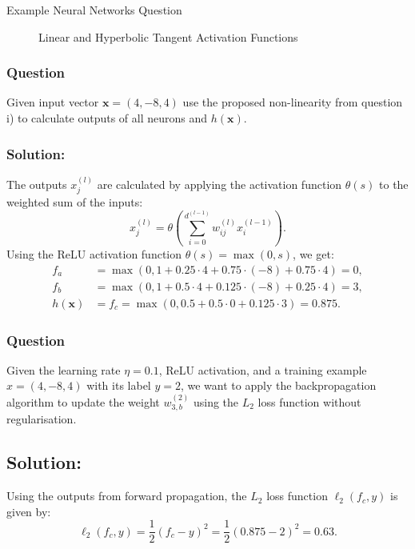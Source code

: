 \begin{examplebox}{Example Neural Networks Question}
\begin{figure}[H]
\caption{Linear and Hyperbolic Tangent Activation Functions}
\end{figure}


\subsubsection*{Question}
Given input vector \( \mathbf{x} = (4, -8, 4) \) use the proposed non-linearity from question i) to calculate outputs of all neurons and \( h(\mathbf{x}) \).

\subsubsection*{Solution:}
The outputs \( x_j^{(l)} \) are calculated by applying the activation function \( \theta(s) \) to the weighted sum of the inputs:
\[ x_j^{(l)} = \theta\left( \sum_{i=0}^{d^{(l-1)}} w_{ij}^{(l)} x_i^{(l-1)} \right). \]
Using the ReLU activation function \( \theta(s) = \max(0, s) \), we get:
\begin{align*}
f_a &= \max(0, 1 + 0.25 \cdot 4 + 0.75 \cdot (-8) + 0.75 \cdot 4) = 0, \\
f_b &= \max(0, 1 + 0.5 \cdot 4 + 0.125 \cdot (-8) + 0.25 \cdot 4) = 3, \\
h(\mathbf{x}) &= f_c = \max(0, 0.5 + 0.5 \cdot 0 + 0.125 \cdot 3) = 0.875.
\end{align*}



\subsubsection*{Question}
Given the learning rate \( \eta = 0.1 \), ReLU activation, and a training example \( x = (4, -8, 4) \) with its label \( y = 2 \), we want to apply the backpropagation algorithm to update the weight \( w_{3,b}^{(2)} \) using the \( L_2 \) loss function without regularisation.

\subsection*{Solution:}
Using the outputs from forward propagation, the \( L_2 \) loss function \( \ell_2(f_c, y) \) is given by:
\[ \ell_2(f_c, y) = \frac{1}{2}(f_c - y)^2 = \frac{1}{2}(0.875 - 2)^2 = 0.63. \]


\end{examplebox}
